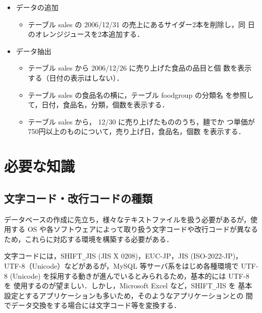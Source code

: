 \begin{itemize}
 \item データの追加
       \begin{itemize}
		\item テーブル sales の 2006/12/31 の売上にあるサイダー2本を削除し，同
       日のオレンジジュースを2本追加する．
       \end{itemize}
 \item データ抽出
       \begin{itemize}
			\item テーブル sales から 2006/12/26 に売り上げた食品の品目と個
	      	数を表示する（日付の表示はしない）．
			\item テーブル sales の食品名の横に，テーブル foodgroup の分類名
	     	を参照して，日付，食品名，分類，個数を表示する．
			\item テーブル sales から， 12/30 に売り上げたもののうち，麺でか
	      つ単価が750円以上のものについて，売り上げ日，食品名，個数
	      を表示する．
       \end{itemize}
\end{itemize}

\section{必要な知識}

\subsection{文字コード・改行コードの種類}
\label{char}

データベースの作成に先立ち，様々なテキストファイルを扱う必要があるが，使
用する OS や各ソフトウェアによって取り扱う文字コードや改行コードが異なる
ため，これらに対応する環境を構築する必要がある．

文字コードには，SHIFT\verb+_+JIS (JIS X 0208)，EUC-JP，JIS (ISO-2022-JP)，
UTF-8（Unicode）などがあるが，MySQL 等サーバ系をはじめ各種環境で UTF-8 
(Unicode) を採用する動きが進んでいるとみられるため，基本的には UTF-8 を
使用するのが望ましい．しかし，Microsoft Excel など，SHIFT\verb+_+JIS を
基本設定とするアプリケーションも多いため，そのようなアプリケーションとの
間でデータ交換をする場合には文字コード等を変換する．

